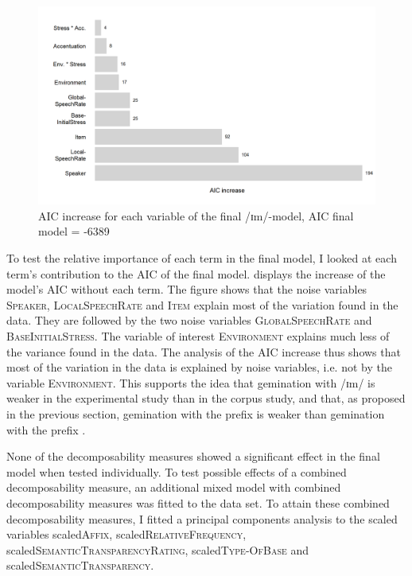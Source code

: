  









\begin{figure}[b!]
	\centering
	\includegraphics[scale=0.7]{images/Experiment/AICdecreaseImComplex.png}
	\caption{AIC increase for each variable of the final /ɪm/-model, AIC final model = -6389}
	\label{fig:Effectsize im experiment}
	
\end{figure}

To test the relative importance of each term in the final model, I looked at each term's contribution to the AIC of the final model.  displays the increase of the model's AIC  without each term. 
The figure shows that the noise variables \textsc{Speaker}, \textsc{LocalSpeechRate} and \textsc{Item} explain  most of the variation found in the data. They are followed by the two noise variables \textsc{GlobalSpeechRate} and \textsc{BaseInitialStress}. The variable of interest \textsc{Environment} explains much less of the variance found in the data. The analysis of the AIC increase thus shows that most of the variation in the data is explained by noise variables, i.e. not by the variable \textsc{Environment}. This supports the idea that gemination with /ɪm/ is weaker in the experimental study than in the corpus study, and that, as proposed in the previous section, gemination with the prefix  is weaker than gemination with the prefix  . 




None of the decomposability measures showed a significant effect in the final model when tested individually. To test possible effects of a combined decomposability measure, an additional mixed model with combined decomposability measures was fitted to the data set.  
To attain these combined decomposability measures, I fitted a principal components analysis to the scaled variables scaled\textsc{Affix}, scaled\textsc{RelativeFrequency}, scaled\textsc{SemanticTransparencyRating}, scaled\textsc{Type-OfBase} and scaled\textsc{SemanticTransparency}.





